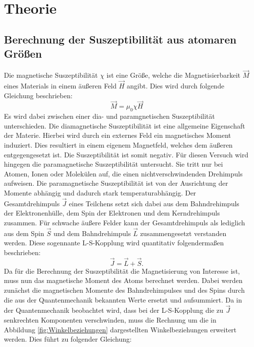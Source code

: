\section{Theorie}
\label{sec:Theorie}

\subsection{Berechnung der Suszeptibilität aus atomaren Größen}
Die magnetische Suszeptibilität $\chi$ ist eine Größe, welche die Magnetisierbarkeit $\vec{M}$ eines Materials in einem äußeren Feld $\vec{H}$ angibt.
Dies wird durch folgende Gleichung beschrieben:
\begin{equation}
  \vec{M} = {\mu}_0 \chi \vec{H}
  \label{eqn:magnetisierung}
\end{equation}
Es wird dabei zwischen einer dia- und paramgnetischen Suszeptibilität unterschieden.
Die diamagnetische Suszeptibilität ist eine allgemeine Eigenschaft der Materie.
Hierbei wird durch ein externes Feld ein magnetisches Moment induziert.
Dies resultiert in einem eigenem Magnetfeld, welches dem äußeren entgegengesetzt ist.
Die Suszeptibilität ist somit negativ.
Für diesen Versuch wird hingegen die paramagnetische Suszeptibilität untersucht.
Sie tritt nur bei Atomen, Ionen oder Molekülen auf, die einen nichtverschwindenden Drehimpuls aufweisen.
Die paramagnetische Suszeptibilität ist von der Ausrichtung der Momente abhängig und dadurch stark temperaturabhängig.
Der Gesamtdrehimpuls $\vec{J}$ eines Teilchens setzt sich dabei aus dem Bahndrehimpuls der Elektronenhülle, dem Spin der Elektronen und dem Kerndrehimpuls zusammen.
Für schwache äußere Felder kann der Gesamtdrehimpuls als lediglich aus dem Spin $\vec{S}$ und dem Bahndrehimpuls $\vec{L}$ zusammengesetzt verstanden werden.
Diese sogennante L-S-Kopplung wird quantitativ folgendermaßen beschrieben:
\begin{equation}
  \vec{J} = \vec{L} + \vec{S} .
\end{equation}
Da für die Berechnung der Suszeptibilität die Magnetisierung von Interesse ist, muss nun das magnetische Moment des Atoms berechnet werden.
Dabei werden zunächst die magnetischen Momente des Bahndrehimpulses und des Spins durch die aus der Quantenmechanik bekannten Werte ersetzt und aufsummiert.
Da in der Quantenmechanik beobachtet wird, dass bei der L-S-Kopplung die zu $\vec{J}$ senkrechten Komponenten verschwinden, muss die Rechnung um die in
Abbildung \ref{fig:Winkelbeziehungen} dargestellten Winkelbeziehungen erweitert werden. Dies führt zu folgender Gleichung:
